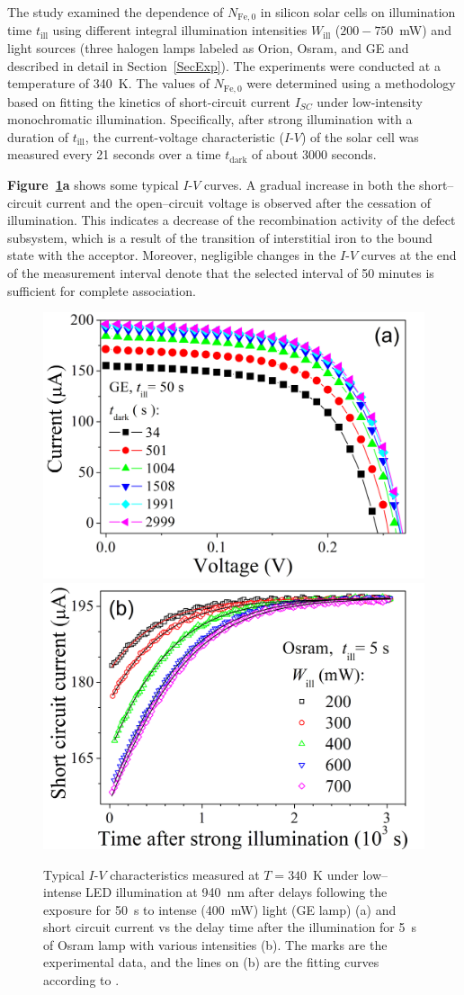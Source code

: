 \documentclass{WileyMSP-template}
\begin{document}
The study examined the dependence of $N_\mathrm{Fe,0}$ in silicon solar cells on illumination time $t_\mathrm{ill}$
using different integral illumination intensities $W_\mathrm{ill}$ ($200-750$~mW) and light sources
(three halogen lamps labeled as Orion, Osram, and GE and described in detail in Section~\ref{SecExp}).
The experiments were conducted at a temperature of 340~K.
The values of $N_\mathrm{Fe,0}$ were  determined using a methodology \cite{Olikh2022:JMatSci,Olikh2021JAP}
based on fitting the kinetics of short-circuit current $I_{SC}$ under low-intensity monochromatic illumination.
Specifically, after strong illumination with a duration of $t_\mathrm{ill}$,
the current-voltage characteristic ($I$-$V$) of the solar cell was measured every 21 seconds over a time $t_\mathrm{dark}$ of about 3000 seconds.

\textbf{Figure~\ref{fig2}a} shows some typical $I$-$V$ curves.
A gradual increase in both the short--circuit current and the open--circuit voltage is observed after the cessation of illumination.
This indicates a decrease of the recombination activity of the defect subsystem,
which is a result of the transition of interstitial iron to the bound state with the acceptor.
Moreover, negligible changes in the $I$-$V$ curves at the end of the measurement interval denote that the selected interval of 50 minutes is sufficient for complete association.


\begin{figure}
\centering
  \includegraphics[width=0.4\linewidth]{Fig2a.png}
  \includegraphics[width=0.4\linewidth]{Fig2b.png}
  \caption{Typical $I$-$V$ characteristics measured at $T=340$~K
  under low--intense LED illumination at 940~nm after delays following the exposure for 50~s to intense (400~mW) light (GE lamp) (a) and
  short circuit current vs the delay time after the illumination for 5~s of Osram lamp with various intensities (b).
  The marks are the experimental data, and the lines on (b) are the fitting curves according to \cite{Olikh2022:JMatSci,Olikh2021JAP}.
  }
  \label{fig2}
\end{figure}
\end{document}
